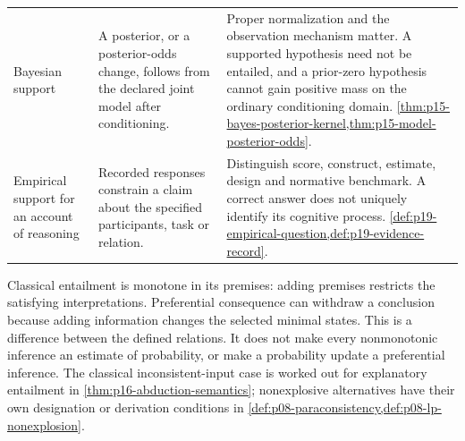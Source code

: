 \begin{longtable}{@{}p{}p{}p{}@{}}
Bayesian support & A posterior, or a posterior-odds change, follows from the
declared joint model after conditioning. & Proper normalization and the
observation mechanism matter. A supported hypothesis need not be entailed,
and a prior-zero hypothesis cannot gain positive mass on the ordinary
conditioning domain.
\cref{thm:p15-bayes-posterior-kernel,thm:p15-model-posterior-odds}. \\
Empirical support for an account of reasoning & Recorded responses constrain
a claim about the specified participants, task or relation. & Distinguish
score, construct, estimate, design and normative benchmark. A correct answer
does not uniquely identify its cognitive process.
\cref{def:p19-empirical-question,def:p19-evidence-record}. \\
\bottomrule
\end{longtable}

Classical entailment is monotone in its premises: adding premises restricts
the satisfying interpretations. Preferential consequence can withdraw a
conclusion because adding information changes the selected minimal states.
This is a difference between the defined relations. It does not make every
nonmonotonic inference an estimate of probability, or make a probability
update a preferential inference. The classical inconsistent-input case is
worked out for explanatory entailment in
\cref{thm:p16-abduction-semantics}; nonexplosive alternatives have their
own designation or derivation conditions in
\cref{def:p08-paraconsistency,def:p08-lp-nonexplosion}.

